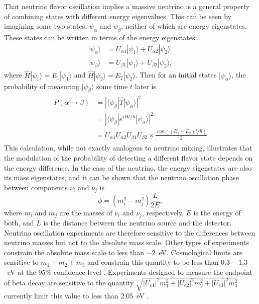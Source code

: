 That neutrino flavor oscillation implies a massive neutrino is a general property of combining states with different energy eigenvalues.  This can be seen by imagining some two states, $\psi_{\alpha}$ and $\psi_{\beta}$, neither of which are energy eigenstates.  These states can be written in terms of the energy eigenstates: 
\begin{align}
|\psi_{\alpha}\rangle &= U_{\alpha 1}|\psi_1\rangle + U_{\alpha 2}|\psi_2\rangle \\
|\psi_{\beta}\rangle &= U_{{\beta}1}|\psi_1\rangle + U_{{\beta}2}|\psi_2\rangle, 
\end{align}
where $\hat{H}|\psi_1\rangle = E_1|\psi_1\rangle$ and $\hat{H}|\psi_2\rangle = E_2|\psi_2\rangle$.  Then for an initial states $|\psi_{\alpha}\rangle$, the probability of measuring $|\psi_{\beta}\rangle$ some time $t$ later is
\begin{align}
\begin{split}
P(\alpha\rightarrow\beta) &=  |\langle\psi_{\beta}|\hat{T}|\psi_{\alpha}\rangle|^2 \\
                             &=  |\langle\psi_{\beta}|e^{i\hat{H}t / \hbar}|\psi_{\alpha}\rangle|^2 \\
                             &=  U_{{\alpha}1}U_{{\alpha}2}U_{{\beta}1}U_{{\beta}2} \times \frac{\cos((E_1 - E_2)t/\hbar)}{2} 
\end{split}
\end{align}
This calculation, while not exactly analogous to neutrino mixing, illustrates that the modulation of the probability of detecting a different flavor state depends on the energy difference.  In the case of the neutrino, the energy eigenstates are also its mass eigenstates, and it can be shown that the neutrino oscillation phase between components $\nu_i$ and $\nu_j$ is \citep{PDG,neutrinoOscillations}
\begin{equation}
\phi = (m_i^2 - m_j^2)\frac{L}{2E},
\end{equation}
where $m_i$ and $m_j$ are the masses of $\nu_i$ and $\nu_j$, respectively, $E$ is the energy of both, and $L$ is the distance between the neutrino source and the detector.  Neutrino oscillation experiments are therefore sensitive to the differences between neutrino masses but not to the absolute mass scale.  Other types of experiments constrain the absolute mass scale to less than $\sim$2~eV.  Cosmological limits are sensitive to $m_1+m_2+m_3$ and constrain this quantity to be less than $0.3-1.3$~eV at the 95\% confidence level \citep{cosmoNuMassLimit}.  Experiments designed to measure the endpoint of beta decay are sensitive to the quantity $\sqrt{|U_{e1}|^2m_1^2 + |U_{e2}|^2m_2^2 + |U_{e3}|^2m_3^2}$ currently limit this value to less than 2.05~eV \citep{tritiumEndpoint}. 


